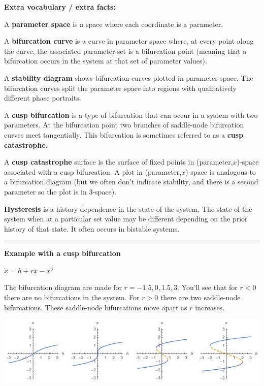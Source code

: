 \documentclass[12pt,letterpaper,noanswers]{exam}
\begin{document}
\noindent \textbf{Extra vocabulary / extra facts:}
\begin{tcolorbox}
A \textbf{parameter space} is a space where each coordinate is a parameter.

A \textbf{bifurcation curve} is a curve in parameter space where, at every point along the curve, the associated parameter set is a bifurcation point (meaning that a bifurcation occurs in the system at that set of parameter values).

A \textbf{stability diagram} shows bifurcation curves plotted in parameter space.  The bifurcation curves split the parameter space into regions with qualitatively different phase portraits.

A \textbf{cusp bifurcation} is a type of bifurcation that can occur in a system with two parameters.  At the bifurcation point two branches of saddle-node bifurcation curves meet tangentially.  This bifurcation is sometimes referred to as a \textbf{cusp catastrophe}.

A \textbf{cusp catastrophe} surface is the surface of fixed points in (parameter,$x$)-space associated with a cusp bifurcation.  A plot in (parameter,$x$)-space is analogous to a bifurcation diagram (but we often don't indicate stability, and there is a second parameter so the plot is in 3-space).

\textbf{Hysteresis} is a history dependence in the state of the system.  The state of the system when at a particular set value may be different depending on the prior history of that state.  It often occurs in bistable systems.
\end{tcolorbox}


\vspace{0.2cm}

\hrule
\vspace{0.2cm}

\noindent\textbf{Example with a cusp bifurcation}

$\dot x = h + r x - x^3$

The bifurcation diagram are made for $r = -1.5, 0, 1.5, 3$.  You'll see that for $r<0$ there are no bifurcations in the system.  For $r > 0$ there are two saddle-node bifurcations.  These saddle-node bifurcations move apart as $r$ increases.

\includegraphics[width=0.9\linewidth]{img/C08stabilitybifn.png}
\end{document}
